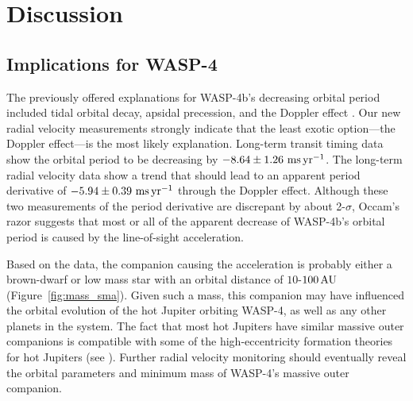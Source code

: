 \documentclass[12pt,twocolumn,tighten]{aastex62}
\begin{document}
\section{Discussion}
\label{sec:discussion}

\subsection{Implications for WASP-4}

The previously offered explanations for WASP-4b's decreasing orbital
period included tidal orbital decay, apsidal precession, and the
Doppler effect \citep{bouma_wasp4b_2019}.  Our new radial velocity
measurements strongly indicate that the least exotic option---the
Doppler effect---is the most likely explanation.  Long-term transit
timing data show the orbital period to be decreasing by $- 8.64 \pm
1.26~{\rm ms}\,{\rm yr}^{-1}$.  The long-term radial velocity data
show a trend that should lead to an apparent period derivative of
$-5.94 \pm 0.39~{\rm ms}\,{\rm yr}^{-1}$ through the Doppler effect.
Although these two measurements of the period derivative are
discrepant by about 2-$\sigma$, Occam's razor suggests that most or
all of the apparent decrease of WASP-4b's orbital period is caused by
the line-of-sight acceleration.

Based on the data, the companion causing the acceleration is probably
either a brown-dwarf or low mass star with an orbital distance of
$10$-$100\,{\rm AU}$ (Figure~\ref{fig:mass_sma}).  Given such a mass,
this companion may have influenced the orbital evolution of the hot
Jupiter orbiting WASP-4, as well as any other planets in the system.
The fact that most hot Jupiters have similar massive outer companions
\citep{knutson_friends_2014,bryan_statistics_2016} is compatible with
some of the high-eccentricity formation theories for hot Jupiters (see
\citealt{dawson_johnson_2018}).  Further radial velocity monitoring
should eventually reveal the orbital parameters and minimum mass of
WASP-4's massive outer companion.
\end{document}
